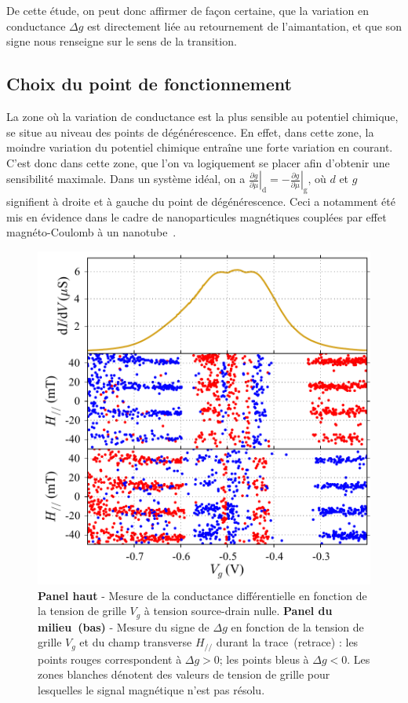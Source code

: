 De cette étude, on peut donc affirmer de façon certaine, que la variation en conductance $\Delta g$ est directement liée au retournement de l'aimantation, et que son signe nous renseigne sur le sens de la transition.


\subsection{Choix du point de fonctionnement}
La zone où la variation de conductance est la plus sensible au potentiel chimique, se situe au niveau des points de dégénérescence. En effet, dans cette zone, la moindre variation du potentiel chimique entraîne une forte variation en courant. C'est donc dans cette zone, que l'on va logiquement se placer afin d'obtenir une sensibilité maximale. Dans un système idéal, on a $\left. \frac{\partial g}{\partial \mu}\right|_{\text{d}} = \left. -\frac{\partial g}{\partial \mu}\right|_{\text{g}}$, où $d$ et $g$ signifient à droite et à gauche du point de dégénérescence. Ceci a notamment été mis en évidence dans le cadre de nanoparticules magnétiques couplées par effet magnéto-Coulomb à un nanotube~\cite{Datta2011}.

\begin{figure}
\parbox{7cm}{
\includegraphics[scale=0.45]{Resultats/PointFonct/PointFonct.pdf} 
}
\parbox{6.5cm}{\caption{\textbf{Panel haut} - Mesure de la conductance différentielle en fonction de la tension de grille $V_g$ à tension source-drain nulle. \textbf{Panel du milieu~(bas)} - Mesure du signe de $\Delta g$ en fonction de la tension de grille $V_g$ et du champ transverse $H_{//}$ durant la trace~(retrace) : les points rouges correspondent à $\Delta g >0$; les points bleus à $\Delta g <0$. Les zones blanches dénotent des valeurs de tension de grille pour lesquelles le signal magnétique n'est pas résolu.}
\label{point_fonctio}
}
\end{figure}

